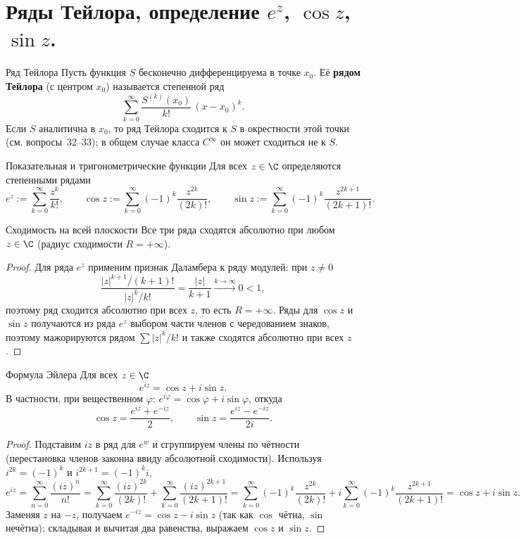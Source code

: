 
\section{Ряды Тейлора, определение $e^z$, $\cos z$, $\sin z$.}

\begin{Definition}{Ряд Тейлора}{}
	Пусть функция $S$ бесконечно дифференцируема в точке $x_0$. Её \textbf{рядом Тейлора} (с центром $x_0$) называется степенной ряд
	\[
	\sum_{k=0}^{\infty} \frac{S^{(k)}(x_0)}{k!}\,(x - x_0)^k.
	\]
	Если $S$ аналитична в $x_0$, то ряд Тейлора сходится к $S$ в окрестности этой точки (см. вопросы~32--33); в общем случае класса $C^\infty$ он может сходиться не к $S$.
\end{Definition}

\begin{Definition}{Показательная и тригонометрические функции}{}
	Для всех $z \in \C$ определяются степенными рядами
	\[
	e^z := \sum_{k=0}^{\infty} \frac{z^k}{k!}, \qquad
	\cos z := \sum_{k=0}^{\infty} (-1)^k \frac{z^{2k}}{(2k)!}, \qquad
	\sin z := \sum_{k=0}^{\infty} (-1)^k \frac{z^{2k+1}}{(2k+1)!}.
	\]
\end{Definition}

\begin{Statement}{Сходимость на всей плоскости}{}
	Все три ряда сходятся абсолютно при любом $z \in \C$ (радиус сходимости $R = +\infty$).
\end{Statement}

\begin{proof}
	Для ряда $e^z$ применим признак Даламбера к ряду модулей: при $z \neq 0$
	\[
	\frac{|z|^{k+1}/(k+1)!}{|z|^{k}/k!} = \frac{|z|}{k + 1} \xrightarrow{k \to \infty} 0 < 1,
	\]
	поэтому ряд сходится абсолютно при всех $z$, то есть $R = +\infty$. Ряды для $\cos z$ и $\sin z$ получаются из ряда $e^z$ выбором части членов с чередованием знаков, поэтому мажорируются рядом $\sum |z|^k/k!$ и также сходятся абсолютно при всех $z$.
\end{proof}

\begin{Statement}{Формула Эйлера}{}
	Для всех $z \in \C$
	\[
	e^{iz} = \cos z + i \sin z.
	\]
	В частности, при вещественном $\varphi$: $e^{i\varphi} = \cos\varphi + i\sin\varphi$, откуда
	\[
	\cos z = \frac{e^{iz} + e^{-iz}}{2}, \qquad \sin z = \frac{e^{iz} - e^{-iz}}{2i}.
	\]
\end{Statement}

\begin{proof}
	Подставим $iz$ в ряд для $e^{w}$ и сгруппируем члены по чётности (перестановка членов законна ввиду абсолютной сходимости). Используя $i^{2k} = (-1)^k$ и $i^{2k+1} = (-1)^k i$,
	\[
	e^{iz} = \sum_{n=0}^{\infty} \frac{(iz)^n}{n!}
	= \sum_{k=0}^{\infty} \frac{(iz)^{2k}}{(2k)!} + \sum_{k=0}^{\infty} \frac{(iz)^{2k+1}}{(2k+1)!}
	= \sum_{k=0}^{\infty} (-1)^k \frac{z^{2k}}{(2k)!} + i\sum_{k=0}^{\infty} (-1)^k \frac{z^{2k+1}}{(2k+1)!} = \cos z + i\sin z.
	\]
	Заменяя $z$ на $-z$, получаем $e^{-iz} = \cos z - i\sin z$ (так как $\cos$ чётна, $\sin$ нечётна); складывая и вычитая два равенства, выражаем $\cos z$ и $\sin z$.
\end{proof}

